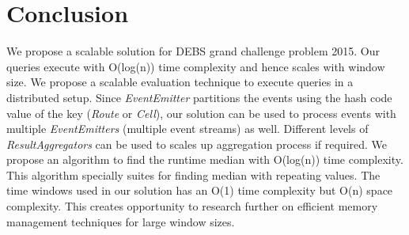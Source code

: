 \section{Conclusion}

We propose a scalable solution for DEBS grand challenge problem 2015. Our queries execute with O(log(n)) time complexity and hence scales with window size. We propose a scalable evaluation technique to execute queries in a distributed setup. Since \textit{EventEmitter} partitions the events using the  hash code value of the key (\textit{Route} or \textit{Cell}), our solution can be used to process events with multiple \textit{EventEmitters} (multiple event streams) as well. Different levels of \textit{ResultAggregators} can be used to scales up aggregation process if required. We propose an algorithm to find the runtime median with O(log(n)) time complexity. This algorithm specially suites for finding median with repeating values. The time windows used in our solution has an O(1) time complexity but O(n) space complexity. This creates opportunity to research further on efficient memory management techniques for large window sizes.
